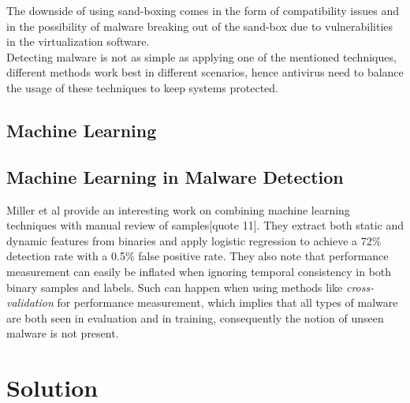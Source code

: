 \documentclass{llncs}
\begin{document}
The downside of using sand-boxing comes in the form of compatibility issues and in the possibility of malware breaking out of the sand-box due to vulnerabilities in the virtualization software.\\

Detecting malware is not as simple as applying one of the mentioned techniques, different methods work best in different scenarios, hence antivirus need to balance the usage of these techniques to keep systems protected.


\subsection{Machine Learning}


\subsection{Machine Learning in Malware Detection}


Miller et al provide an interesting work on combining machine learning techniques with manual review of samples[quote 11]. They extract both static and dynamic features from binaries and apply logistic regression to achieve a 72\% detection rate with a 0.5\% false positive rate. They also note that performance measurement can easily be inflated when ignoring temporal consistency in both binary samples and labels. Such can happen when using methods like \textit{cross-validation} for performance measurement, which implies that all types of malware are both seen in evaluation and in training, consequently the notion of unseen malware is not present.

% 

\section{Solution}\label{sec:solution}
\end{document}
